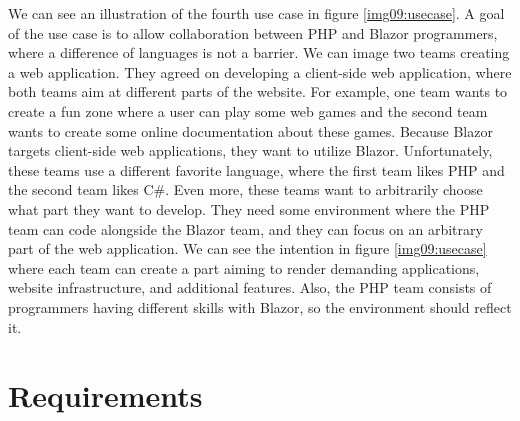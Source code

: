 \par
We can see an illustration of the fourth use case in figure \ref{img09:usecase}.
A goal of the use case is to allow collaboration between PHP and Blazor programmers, where a difference of languages is not a barrier.  
We can image two teams creating a web application. 
They agreed on developing a client-side web application, where both teams aim at different parts of the website.
For example, one team wants to create a fun zone where a user can play some web games and the second team wants to create some online documentation about these games.
Because Blazor targets client-side web applications, they want to utilize Blazor.
Unfortunately, these teams use a different favorite language, where the first team likes PHP and the second team likes C\#.
Even more, these teams want to arbitrarily choose what part they want to develop.
They need some environment where the PHP team can code alongside the Blazor team, and they can focus on an arbitrary part of the web application.
We can see the intention in figure \ref{img09:usecase} where each team can create a part aiming to render demanding applications, website infrastructure, and additional features.
Also, the PHP team consists of programmers having different skills with Blazor, so the environment should reflect it.

\section{Requirements}

